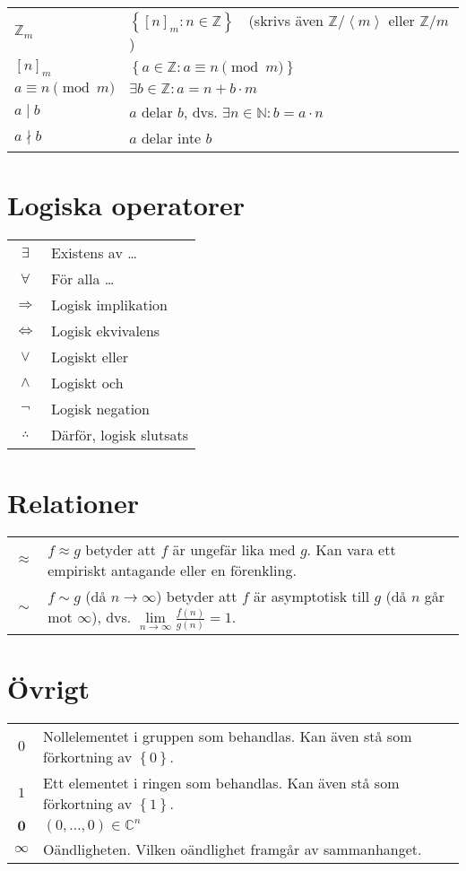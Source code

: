 \begin{tabular}{lp{10.5cm}}
$\mathbb{Z}_m$ & $\left\lbrace \left[ n \right] _m : n \in \mathbb{Z}\right\rbrace$ \,\, (skrivs även $\mathbb{Z}/\left\langle m \right\rangle$ eller $\mathbb{Z}/m$) \\
$\left[ n \right] _m$ & $\left\lbrace a \in \mathbb{Z} : a \equiv n \pmod{m}\right\rbrace$ \\
$a \equiv n \pmod{m}$ & $\exists b \in \mathbb{Z} : a = n + b \cdot m$ \\
$a \mid b$ & $a$ delar $b$, dvs. $\exists n \in \mathbb{N} : b = a \cdot n$ \\
$a \nmid b$ & $a$ delar inte $b$
\end{tabular}

\section{Logiska operatorer}

\begin{tabular}{cp{10.5cm}}
$\exists$ & Existens av \ldots \\
$\forall$ & För alla \ldots \\
$\Longrightarrow$ & Logisk implikation \\
$\Longleftrightarrow$ & Logisk ekvivalens \\
$\vee$ & Logiskt eller \\
$\wedge$ & Logiskt och \\
$\neg$ & Logisk negation \\
$\therefore$ & Därför, logisk slutsats
\end{tabular}

\section{Relationer}

\begin{tabular}{cp{10.5cm}}
$\approx$ & $f \approx g$ betyder att $f$ är ungefär lika med $g$. Kan vara ett empiriskt antagande eller en förenkling.\\
$\sim$ & $f \sim g$ (då $n \rightarrow \infty$) betyder att $f$ är asymptotisk till $g$ (då $n$ går mot $\infty$), dvs. $\lim\limits_{n \rightarrow \infty}\frac{f(n)}{g(n)}=1$.\\
\end{tabular}
\section{Övrigt}

\begin{tabular}{cp{10.5cm}}
$0$ & Nollelementet i gruppen som behandlas. Kan även stå som förkortning
av $\left\lbrace 0\right\rbrace$. \\
$1$ & Ett elementet i ringen som behandlas. Kan även stå som förkortning
av $\left\lbrace 1\right\rbrace$. \\
$\mathbf{0}$ & $\left(0, \ldots , 0\right) \in \mathbb{C} ^n$ \\
$\infty$ & Oändligheten. Vilken oändlighet framgår av sammanhanget. \\
\end{tabular}
